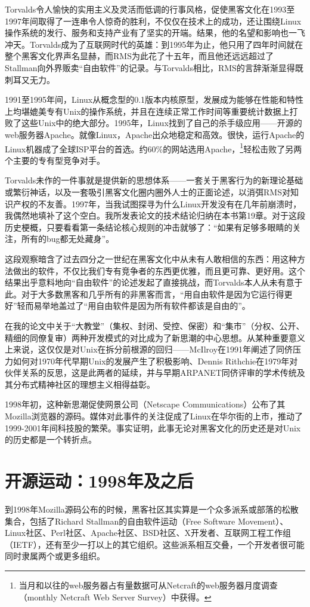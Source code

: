 \documentclass[12pt,oneside]{book}
\begin{document}
Torvalds令人愉快的实用主义及灵活而低调的行事风格，促使黑客文化在1993至1997年间取得了一连串令人惊奇的胜利，不仅仅在技术上的成功，还让围绕Linux操作系统的发行、服务和支持产业有了坚实的开端。结果，他的名望和影响也一飞冲天。Torvalds成为了互联网时代的英雄：到1995年为止，他只用了四年时间就在整个黑客文化界声名显赫，而RMS为此花了十五年，而且他还远远超过了Stallman向外界贩卖“自由软件”的记录。与Torvalds相比，RMS的言辞渐渐显得既刺耳又无力。

1991至1995年间，Linux从概念型的0.1版本内核原型，发展成为能够在性能和特性上均堪媲美专有Unix的操作系统，并且在连续正常工作时间等重要统计数据上打败了这些Unix中的绝大部分。1995年，Linux找到了自己的杀手级应用——开源的web服务器Apache。就像Linux，Apache出众地稳定和高效。很快，运行Apache的Linux机器成了全球ISP平台的首选。约60\%{}的网站选用Apache，\footnote{当月和以往的web服务器占有量数据可从Netcraft的web服务器月度调查（monthly Netcraft Web Server Survey）中获得。}轻松击败了另两个主要的专有型竞争对手。

Torvalds未作的一件事就是提供新的思想体系——一套关于黑客行为的新理论基础或繁衍神话，以及一套吸引黑客文化圈内圈外人士的正面论述，以消弭RMS对知识产权的不友善。1997年，当我试图探寻为什么Linux开发没有在几年前崩溃时，我偶然地填补了这个空白。我所发表论文\cite{Raymond01}的技术结论归纳在本书第19章。对于这段历史梗概，只要看看第一条结论核心规则的冲击就够了：“如果有足够多眼睛的关注，所有的bug都无处藏身”。

这段观察暗含了过去四分之一世纪在黑客文化中从未有人敢相信的东西：用这种方法做出的软件，不仅比我们专有竞争者的东西更优雅，而且更可靠、更好用。这个结果出乎意料地向“自由软件”的论述发起了直接挑战，而Torvalds本人从未有意于此。对于大多数黑客和几乎所有的非黑客而言，“用自由软件是因为它运行得更好”轻而易举地盖过了“用自由软件是因为所有软件都该是自由的”。

在我的论文中关于“大教堂”（集权、封闭、受控、保密）和“集市”（分权、公开、精细的同僚复审）两种开发模式的对比成为了新思潮的中心思想。从某种重要意义上来说，这仅仅是对Unix在拆分前根源的回归——McIlroy在1991年阐述了同侪压力如何对1970年代早期Unix的发展产生了积极影响、Dennis Rithchie在1979年对伙伴关系的反思，这是此两者的延续，并与早期ARPANET同侪评审的学术传统及其分布式精神社区的理想主义相得益彰。

1998年初，这种新思潮促使网景公司（Netscape Communications）公布了其Mozilla浏览器的源码。媒体对此事件的关注促成了Linux在华尔街的上市，推动了1999-2001年间科技股的繁荣。事实证明，此事无论对黑客文化的历史还是对Unix的历史都是一个转折点。

\section{开源运动：1998年及之后}
到1998年Mozilla源码公布的时候，黑客社区其实算是一个众多派系或部落的松散集合，包括了Richard Stallman的自由软件运动（Free Software Movement）、Linux社区、Perl社区、Apache社区、BSD社区、X开发者、互联网工程工作组（IETF），还有至少一打以上的其它组织。这些派系相互交叠，一个开发者很可能同时隶属两个或更多组织。
\end{document}
